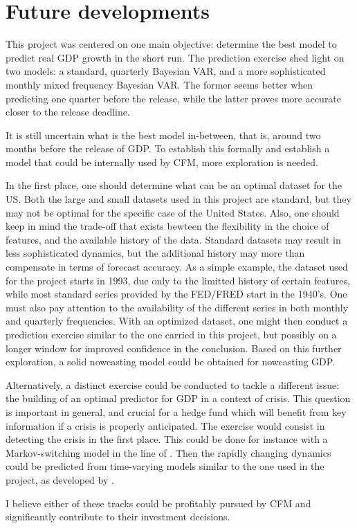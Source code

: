 \section{Future developments}
\label{chapter4_section5}

This project was centered on one main objective: determine the best model to predict real GDP growth in the short run. The prediction exercise shed light on two models: a standard, quarterly Bayesian VAR, and a more sophisticated monthly mixed frequency Bayesian VAR. The former seems better when predicting one quarter before the release, while the latter proves more accurate closer to the release deadline.

It is still uncertain what is the best model in-between, that is, around two months before the release of GDP. To establish this formally and establish a model that could be internally used by CFM, more exploration is needed. 

\newpage

In the first place, one should determine what can be an optimal dataset for the US. Both the large and small datasets used in this project are standard, but they may not be optimal for the specific case of the United States. Also, one should keep in mind the trade-off that exists bewteen the flexibility in the choice of features, and the available history of the data. Standard datasets may result in less sophisticated dynamics, but the additional history may more than compensate in terms of forecast accuracy. As a simple example, the dataset used for the project starts in 1993, due only to the limitted history of certain features, while most standard series provided by the FED/FRED start in the 1940's. One must also pay attention to the availability of the different series in both monthly and quarterly frequencies. With an optimized dataset, one might then conduct a prediction exercise similar to the one carried in this project, but possibly on a longer window for improved confidence in the conclusion. Based on this further exploration, a solid nowcasting model could be obtained for nowcasting GDP.

Alternatively, a distinct exercise could be conducted to tackle a different issue: the building of an optimal predictor for GDP in a context of crisis. This question is important in general, and crucial for a hedge fund which will benefit from key information if a crisis is properly anticipated. The exercise would consist in detecting the crisis in the first place. This could be done for instance with a Markov-switching model in the line of \cite{Warne2015}. Then the rapidly changing dynamics could be predicted from time-varying models similar to the one used in the project, as developed by \cite{Primiceri2005}.

I believe either of these tracks could be profitably pursued by CFM and significantly contribute to their investment decisions. 

